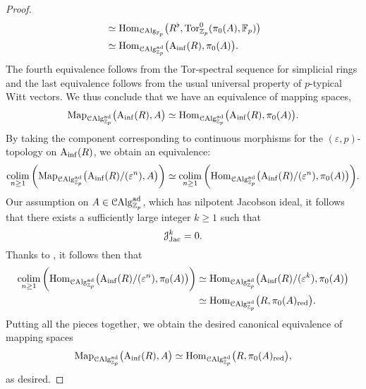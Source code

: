 \documentclass[10pt,a4paper]{amsart}
\numberwithin{equation}{subsection}
\theoremstyle{definition}
\begin{document}
\begin{proof}
\begin{align*}
                                                                                    & \simeq \mathrm{Hom}_{\mathcal{C}\mathrm{Alg}_{\mathbb F_p}} \big( R^\flat, \mathrm{Tor}^0_{\mathbb Z_p}(\pi_0(A), \mathbb F_p) \big) \\
                                                                                    & \simeq \mathrm{Hom}_{\mathcal C \mathrm{Alg}^{\mathrm{ad}}_{\mathbb Z_p}} \big( \mathrm{A}_{\mathrm{inf}}(R), \pi_0(A ) \big)  .                                                                     
        \end{align*}
    The fourth equivalence follows from the Tor-spectral sequence for simplicial rings and the last equivalence follows from the usual universal property of $p$-typical Witt vectors.
    We thus conclude that we have an equivalence of mapping spaces,
        \[
            \mathrm{Map}_{\mathcal C \mathrm{Alg}^{\mathrm{ad}}_{\mathbb Z_p}}\big( \mathrm{A}_{\mathrm{inf}}(R), A \big) \simeq \mathrm{Hom}_{\mathcal C \mathrm{Alg}^{\mathrm{ad}}_{\mathbb Z_p}} \big( \mathrm{A}_{\mathrm{inf}}(R), \pi_0(A) \big).
        \]
    By taking the component corresponding to continuous morphisms for the $(\varepsilon, p)$-topology on $\mathrm{A}_{\mathrm{inf}}(R)$, we obtain an equivalence:
        \[
            \operatorname*{colim}_{n \geq 1} \bigg( \mathrm{Map}_{\mathcal C \mathrm{Alg}^{\mathrm{ad}}_{\mathbb Z_p}} \big( \mathrm{A}_{\mathrm{inf}}(R)/(\varepsilon^n), A \big) \bigg) \simeq \operatorname*{colim}_{n \geq 1} \bigg( \mathrm{Hom}_{\mathcal C \mathrm{Alg}^{\mathrm{ad}}_{\mathbb Z_p}} \big( \mathrm{A}_{\mathrm{inf}}(R)/(\varepsilon^n), \pi_0(A) \big)  \bigg).
        \]
    Our assumption on $A \in \mathcal C \mathrm{Alg}^{\mathrm{ad}}_{\mathbb Z_p}$, which has nilpotent Jacobson ideal, it follows that there exists a sufficiently large integer $k \geq 1$ such that
        \[
            \mathcal J_{\mathrm{Jac}}^k = 0.  
        \]
    Thanks to \cite[Proposition 3.14]{szamuely2016p}, it follows then that
        \begin{align*}
            \operatorname*{colim}_{n \geq 1} \bigg( \mathrm{Hom}_{\mathcal C \mathrm{Alg}^{\mathrm{ad}}_{\mathbb Z_p}} \big( \mathrm{A}_{\mathrm{inf}}(R) / (\varepsilon^n), \pi_0(A) \big) \bigg) & \simeq \mathrm{Hom}_{\mathcal C \mathrm{Alg}^{\mathrm{ad}}_{\mathbb Z_p}} \big( \mathrm{A}_{\mathrm{inf}}(R)/(\varepsilon^k), \pi_0(A)  \big)  \\
                                                                                                   & \simeq  \mathrm{Hom}_{\mathcal C \mathrm{Alg}^{\mathrm{ad}}_{\mathbb Z_p}} \big( R, \pi_0(A)_{\mathrm{red}} \big).
        \end{align*}
    Putting all the pieces together, we obtain the desired canonical equivalence of mapping spaces 
        \[
            \mathrm{Map}_{\mathcal C \mathrm{Alg}^{\mathrm{ad}}_{\mathbb Z_p}} \big( \mathrm{A}_{\mathrm{inf}}(R), A \big) \simeq \mathrm{Hom}_{\mathcal C \mathrm{Alg}^{\mathrm{ad}}_{\mathbb Z_p}} \big( R, \pi_0(A)_{\mathrm{red}} \big) , 
        \]
    as desired.

\end{proof}
\end{document}
